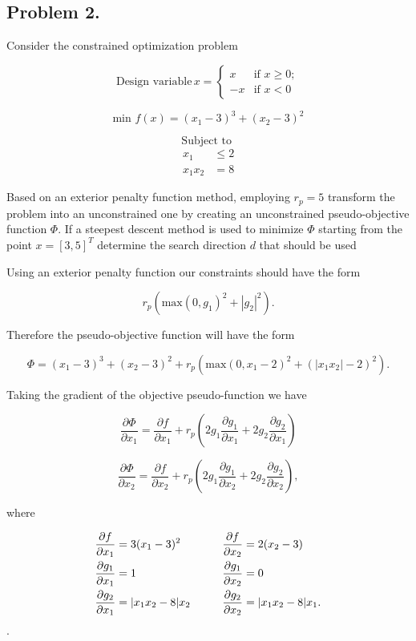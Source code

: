 \documentclass{article}
\begin{document}
    \subsection*{Problem 2.}\label{problem-2}

Consider the constrained optimization problem

\[\mbox{Design variable} \, x = \left\{ \begin{array}{ll}
         x & \mbox{if $x \geq 0$};\\
        -x & \mbox{if $x < 0$}\end{array} \right. \]

\[ \mbox{min } f(x) = (x_1 - 3)^3 + (x_2 -3)^2\]

\[ \mbox{Subject to }\] \[\begin{array}{ll} x_1  &\leq 2 \\
                                        x_1x_2 &= 8 \end{array}\]

Based on an exterior penalty function method, employing $r_p = 5$
transform the problem into an unconstrained one by creating an
unconstrained pseudo-objective function $\Phi$. If a steepest descent
method is used to minimize $\Phi$ starting from the point $x = [3, 5]^T$
determine the search direction $d$ that should be used

Using an exterior penalty function our constraints should have the form

\[r_p(\mbox{max}(0, g_1)^2 + |g_2|^2).\]

Therefore the pseudo-objective function will have the form

\[\Phi = (x_1 - 3)^3 + (x_2 -3)^2 + r_p(\mbox{max}(0, x_1 - 2)^2 + (|x_1 x_2|- 2)^2).\]

Taking the gradient of the objective pseudo-function we have

\[\frac{\partial \Phi}{\partial x_1}  = \frac{\partial f}{\partial x_1} + r_p \left(2 g_1 \frac{\partial g_1}{\partial x_1} + 2g_2 \frac{\partial g_2}{\partial x_1} \right)\]

\[\frac{\partial \Phi}{\partial x_2} = \frac{\partial f}{\partial x_2} + r_p \left(2 g_1 \frac{\partial g_1}{\partial x_2} + 2g_2 \frac{\partial g_2}{\partial x_2} \right),\]

where

\begin{eqnarray*} \begin{split}
				 \frac{\partial f}{\partial x_1} &= 3(x_1 - 3)^2 \\
                \frac{\partial g_1}{\partial x_1} &= 1\\
                \frac{\partial g_2}{\partial x_1} &= |x_1x_2 - 8|x_2 \\ \end{split} \hspace{10 mm} \begin{split}
                \frac{\partial f}{\partial x_2} &= 2(x_2 -3) \\
                \frac{\partial g_1}{\partial x_2} &= 0 \\
                \frac{\partial g_2}{\partial x_2} &= |x_1x_2 -8|x_1. \end{split} \end{eqnarray*}.
\end{document}
